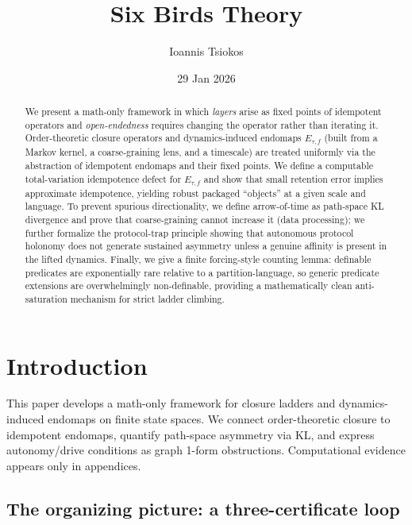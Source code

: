 \documentclass[11pt]{article}
\title{Six Birds Theory}
\author{Ioannis Tsiokos}
\date{29 Jan 2026}
\theoremstyle{remark}
\begin{document}
\maketitle

\begin{abstract}
We present a math-only framework in which \emph{layers} arise as fixed points of idempotent operators and \emph{open-endedness} requires changing the operator rather than iterating it.
Order-theoretic closure operators and dynamics-induced endomaps $E_{\tau,f}$ (built from a Markov kernel, a coarse-graining lens, and a timescale) are treated uniformly via the abstraction of idempotent endomaps and their fixed points.
We define a computable total-variation idempotence defect for $E_{\tau,f}$ and show that small retention error implies approximate idempotence, yielding robust packaged “objects” at a given scale and language.
To prevent spurious directionality, we define arrow-of-time as path-space KL divergence and prove that coarse-graining cannot increase it (data processing); we further formalize the protocol-trap principle showing that autonomous protocol holonomy does not generate sustained asymmetry unless a genuine affinity is present in the lifted dynamics.
Finally, we give a finite forcing-style counting lemma: definable predicates are exponentially rare relative to a partition-language, so generic predicate extensions are overwhelmingly non-definable, providing a mathematically clean anti-saturation mechanism for strict ladder climbing.
\end{abstract}

\tableofcontents

\section{Introduction}
This paper develops a math-only framework for closure ladders and dynamics-induced endomaps on
finite state spaces. We connect order-theoretic closure to idempotent endomaps, quantify
path-space asymmetry via KL, and express autonomy/drive conditions as graph 1-form obstructions.
Computational evidence appears only in appendices.

\subsection{The organizing picture: a three-certificate loop}\label{sec:big-picture}
\end{document}
